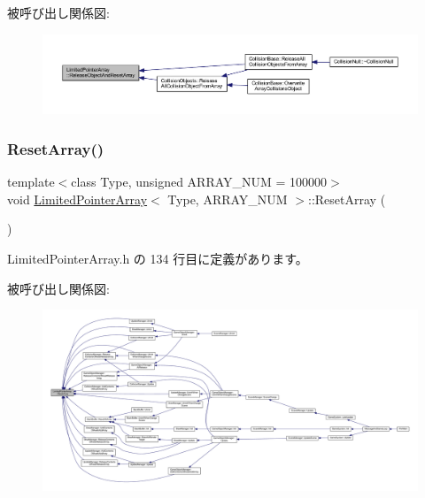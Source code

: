 被呼び出し関係図\+:\nopagebreak
\begin{figure}[H]
\begin{center}
\leavevmode
\includegraphics[width=350pt]{class_limited_pointer_array_a5e34faa11f4b901153f85428027aa21e_icgraph}
\end{center}
\end{figure}
\mbox{\label{class_limited_pointer_array_ae5a41fe945c1ee5ea73116b823011a8c}} 
\subsubsection{\texorpdfstring{Reset\+Array()}{ResetArray()}}
{\footnotesize\ttfamily template$<$class Type, unsigned A\+R\+R\+A\+Y\+\_\+\+N\+UM = 100000$>$ \\
void \mbox{\hyperlink{class_limited_pointer_array}{Limited\+Pointer\+Array}}$<$ Type, A\+R\+R\+A\+Y\+\_\+\+N\+UM $>$\+::Reset\+Array (\begin{DoxyParamCaption}{ }\end{DoxyParamCaption})\hspace{0.3cm}{\ttfamily [inline]}}



 Limited\+Pointer\+Array.\+h の 134 行目に定義があります。

被呼び出し関係図\+:
\nopagebreak
\begin{figure}[H]
\begin{center}
\leavevmode
\includegraphics[width=350pt]{class_limited_pointer_array_ae5a41fe945c1ee5ea73116b823011a8c_icgraph}
\end{center}
\end{figure}
\mbox{\label{class_limited_pointer_array_a1093a96cb123b3fed52bdfcea1055f33}} 
